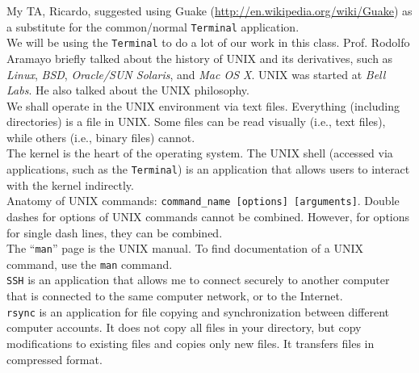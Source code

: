 My TA, Ricardo, suggested using Guake (\url{http://en.wikipedia.org/wiki/Guake}) as a substitute for the common/normal {\tt Terminal} application. \\

We will be using the {\tt Terminal} to do a lot of our work in this class. Prof. Rodolfo Aramayo briefly talked about the history of UNIX and its derivatives, such as {\it Linux}, {\it BSD}, {\it Oracle/SUN Solaris}, and {\it Mac OS X}. UNIX was started at {\it Bell Labs}. He also talked about the UNIX philosophy. \\

We shall operate in the UNIX environment via text files. Everything (including directories) is a file in UNIX. Some files can be read visually (i.e., text files), while others (i.e., binary files) cannot. \\




The kernel is the heart of the operating system. The UNIX shell (accessed via applications, such as the {\tt Terminal}) is an application that allows users to interact with the kernel indirectly. \\





Anatomy of UNIX commands: {\tt command\_name [options] [arguments]}. Double dashes for options of UNIX commands cannot be combined. However, for options for single dash lines, they can be combined. \\

The ``{\tt man}'' page is the UNIX manual. To find documentation of a UNIX command, use the {\tt man} command. \\

{\tt SSH} is an application that allows me to connect securely to another computer that is connected to the same computer network, or to the Internet. \\

{\tt rsync} is an application for file copying and synchronization between different computer accounts. It does not copy all files in your directory, but copy modifications to existing files and copies only new files. It transfers files in compressed format. \\



